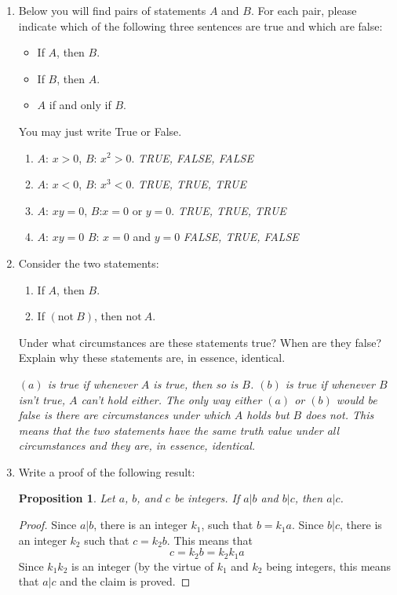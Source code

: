 \documentclass[11pt]{preprint}
\newtheorem{proposition}{Proposition}
\begin{document}
\begin{enumerate}
\item  Below you will find pairs of statements $A$ and $B$. For each pair, please indicate which of the following three sentences are true and which are false:
\begin{itemize}
\item If $A$, then $B$.
\item If $B$, then $A$.
\item $A$ if and only if $B$.
\end{itemize}
You may just write True or False.
\begin{enumerate}
\item $A$: $x>0$,  $B$: $x^2>0$. \textit{TRUE, FALSE, FALSE}
\item $A$: $x<0$,  $B$: $x^3<0$. \textit{TRUE, TRUE, TRUE}
\item $A$: $xy=0$, $B$:$x=0$ or $y=0$. \textit{TRUE, TRUE, TRUE}
\item $A$: $xy=0$  $B$: $x=0$ and $y=0$ \textit{FALSE, TRUE, FALSE}
\end{enumerate}

\item Consider the two statements:
\begin{enumerate}
\item If $A$, then $B$.
\item If $(\textrm{not}~B)$, then $\textrm{not}~A$.
\end{enumerate}
Under what circumstances are these statements true? When are they false? Explain why these statements are, in essence, identical.

\vspace{0.1cm}
\textit{$(a)$ is true if whenever $A$ is true, then so is $B$. $(b)$ is true if whenever $B$ isn't true, $A$ can't hold either. The only way either $(a)$ or $(b)$ would be false is there are circumstances under which $A$ holds but $B$ does not. This means that the two statements have the same truth value under all circumstances and they are, in essence, identical.}
\vspace{0.1cm}


\item Write a proof of the following result:
\begin{proposition}\label{prop:divtrans}
Let $a$, $b$, and $c$ be integers. If $a|b$ and $b|c$, then $a|c$.
\end{proposition}

\begin{proof}
Since $a|b$, there is an integer $k_1$, such that $b=k_1a$. Since $b|c$, there is an integer $k_2$ such that $c=k_2b$. This means that
\[
c=k_2b=k_2k_1a
\]
Since $k_1k_2$ is an integer (by the virtue of $k_1$ and $k_2$ being integers, this means that $a|c$ and the claim is proved.
\end{proof}


\end{enumerate}
\end{document}
